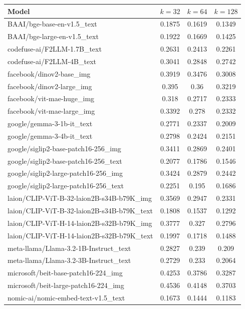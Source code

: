 \begin{table}[ht]
\centering
\begin{tabular}{lccc}
\hline
Model & $k=32$ & $k=64$ & $k=128$ \\
\hline
BAAI/bge-base-en-v1.5\_text & 0.1875 & 0.1619 & 0.1349 \\
BAAI/bge-large-en-v1.5\_text & 0.1922 & 0.1669 & 0.1425 \\
codefuse-ai/F2LLM-1.7B\_text & 0.2631 & 0.2413 & 0.2261 \\
codefuse-ai/F2LLM-4B\_text & 0.3041 & 0.2848 & 0.2742 \\
facebook/dinov2-base\_img & 0.3919 & 0.3476 & 0.3008 \\
facebook/dinov2-large\_img & 0.395 & 0.36 & 0.3219 \\
facebook/vit-mae-huge\_img & 0.318 & 0.2717 & 0.2333 \\
facebook/vit-mae-large\_img & 0.3392 & 0.278 & 0.2332 \\
google/gemma-3-1b-it\_text & 0.2771 & 0.2337 & 0.2009 \\
google/gemma-3-4b-it\_text & 0.2798 & 0.2424 & 0.2151 \\
google/siglip2-base-patch16-256\_img & 0.3411 & 0.2869 & 0.2401 \\
google/siglip2-base-patch16-256\_text & 0.2077 & 0.1786 & 0.1546 \\
google/siglip2-large-patch16-256\_img & 0.3424 & 0.2879 & 0.2442 \\
google/siglip2-large-patch16-256\_text & 0.2251 & 0.195 & 0.1686 \\
laion/CLIP-ViT-B-32-laion2B-s34B-b79K\_img & 0.3569 & 0.2947 & 0.2331 \\
laion/CLIP-ViT-B-32-laion2B-s34B-b79K\_text & 0.1808 & 0.1537 & 0.1292 \\
laion/CLIP-ViT-H-14-laion2B-s32B-b79K\_img & 0.3777 & 0.327 & 0.2796 \\
laion/CLIP-ViT-H-14-laion2B-s32B-b79K\_text & 0.1997 & 0.1718 & 0.1488 \\
meta-llama/Llama-3.2-1B-Instruct\_text & 0.2827 & 0.239 & 0.209 \\
meta-llama/Llama-3.2-3B-Instruct\_text & 0.2729 & 0.233 & 0.2064 \\
microsoft/beit-base-patch16-224\_img & 0.4253 & 0.3786 & 0.3287 \\
microsoft/beit-large-patch16-224\_img & 0.4536 & 0.4148 & 0.3703 \\
nomic-ai/nomic-embed-text-v1.5\_text & 0.1673 & 0.1444 & 0.1183 \\

\end{tabular}
\end{table}
